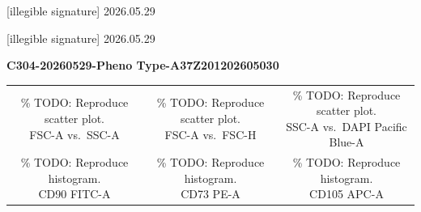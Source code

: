 \documentclass[UTF8,10pt,a4paper,fontset=fandol]{ctexart}
\newcommand{\handwritten}[1]{#1}
\begin{document}
\handwritten{[illegible signature] 2026.05.29}

\handwritten{[illegible signature] 2026.05.29}

\newpage

\begin{center}
\textbf{C304-20260529-Pheno Type-A37Z201202605030}
\end{center}

\begin{center}
\begin{tabular}{ccc}
\fbox{\parbox[c][3.0cm][c]{0.28\linewidth}{\centering
\% TODO: Reproduce scatter plot.\newline
FSC-A vs.\ SSC-A}} &
\fbox{\parbox[c][3.0cm][c]{0.28\linewidth}{\centering
\% TODO: Reproduce scatter plot.\newline
FSC-A vs.\ FSC-H}} &
\fbox{\parbox[c][3.0cm][c]{0.28\linewidth}{\centering
\% TODO: Reproduce scatter plot.\newline
SSC-A vs.\ DAPI Pacific Blue-A}} \\[0.4cm]
\fbox{\parbox[c][3.0cm][c]{0.28\linewidth}{\centering
\% TODO: Reproduce histogram.\newline
CD90 FITC-A}} &
\fbox{\parbox[c][3.0cm][c]{0.28\linewidth}{\centering
\% TODO: Reproduce histogram.\newline
CD73 PE-A}} &
\fbox{\parbox[c][3.0cm][c]{0.28\linewidth}{\centering
\% TODO: Reproduce histogram.\newline
CD105 APC-A}}
\end{tabular}
\end{center}

\bigskip
\end{document}
